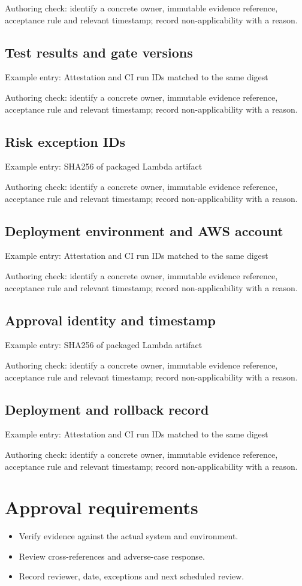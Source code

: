 \documentclass[10pt,letterpaper]{article}
\begin{document}
Authoring check: identify a concrete owner, immutable evidence reference, acceptance rule and relevant timestamp; record non-applicability with a reason.


\subsection{Test results and gate versions}
Example entry: Attestation and CI run IDs matched to the same digest

Authoring check: identify a concrete owner, immutable evidence reference, acceptance rule and relevant timestamp; record non-applicability with a reason.


\subsection{Risk exception IDs}
Example entry: SHA256 of packaged Lambda artifact

Authoring check: identify a concrete owner, immutable evidence reference, acceptance rule and relevant timestamp; record non-applicability with a reason.


\subsection{Deployment environment and AWS account}
Example entry: Attestation and CI run IDs matched to the same digest

Authoring check: identify a concrete owner, immutable evidence reference, acceptance rule and relevant timestamp; record non-applicability with a reason.


\subsection{Approval identity and timestamp}
Example entry: SHA256 of packaged Lambda artifact

Authoring check: identify a concrete owner, immutable evidence reference, acceptance rule and relevant timestamp; record non-applicability with a reason.


\subsection{Deployment and rollback record}
Example entry: Attestation and CI run IDs matched to the same digest

Authoring check: identify a concrete owner, immutable evidence reference, acceptance rule and relevant timestamp; record non-applicability with a reason.


\section{Approval requirements}
\begin{itemize}
\item Verify evidence against the actual system and environment.
\item Review cross-references and adverse-case response.
\item Record reviewer, date, exceptions and next scheduled review.
\end{itemize}
\end{document}
